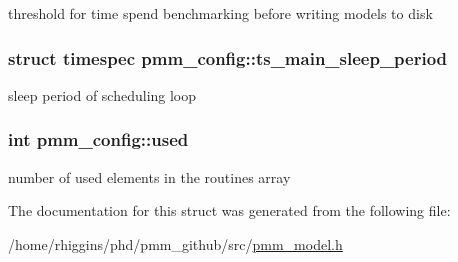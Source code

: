 threshold for time spend benchmarking before writing models to disk \hypertarget{structpmm__config_a8db2c3a66e1a09d1b5c6d0dd39071179}{
\subsubsection[{ts\-\_\-main\-\_\-sleep\-\_\-period}]{\setlength{\rightskip}{0pt plus 5cm}struct timespec pmm\-\_\-config\-::ts\-\_\-main\-\_\-sleep\-\_\-period}}\label{structpmm__config_a8db2c3a66e1a09d1b5c6d0dd39071179}
sleep period of scheduling loop \hypertarget{structpmm__config_a9eb6d84fd4e29152c4e0ca60a7b4d77d}{
\subsubsection[{used}]{\setlength{\rightskip}{0pt plus 5cm}int pmm\-\_\-config\-::used}}\label{structpmm__config_a9eb6d84fd4e29152c4e0ca60a7b4d77d}
number of used elements in the routines array 

The documentation for this struct was generated from the following file\-:\begin{DoxyCompactItemize}
\item 
/home/rhiggins/phd/pmm\-\_\-github/src/\hyperlink{pmm__model_8h}{pmm\-\_\-model.\-h}\end{DoxyCompactItemize}
